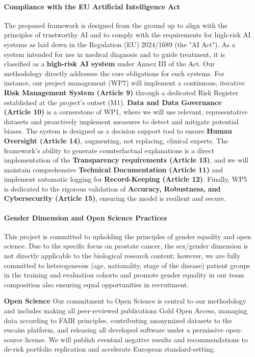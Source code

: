 \documentclass[11pt, a4paper]{article}
\begin{document}
\paragraph{Compliance with the EU Artificial Intelligence Act}
The proposed framework is designed from the ground up to align with the principles of trustworthy AI and to comply with the requirements for high-risk AI systems as laid down in the Regulation (EU) 2024/1689 (the "AI Act"). As a system intended for use in medical diagnosis and to guide treatment, it is classified as a \textbf{high-risk AI system} under Annex III of the Act. Our methodology directly addresses the core obligations for such systems. For instance, our project management (WP7) will implement a continuous, iterative \textbf{Risk Management System (Article 9)} through a dedicated Risk Register established at the project's outset (M1). \textbf{Data and Data Governance (Article 10)} is a cornerstone of WP1, where we will use relevant, representative datasets and proactively implement measures to detect and mitigate potential biases. The system is designed as a decision support tool to ensure \textbf{Human Oversight (Article 14)}, augmenting, not replacing, clinical experts. The framework's ability to generate counterfactual explanations is a direct implementation of the \textbf{Transparency requirements (Article 13)}, and we will maintain comprehensive \textbf{Technical Documentation (Article 11)} and implement automatic logging for \textbf{Record-Keeping (Article 12)}. Finally, WP5 is dedicated to the rigorous validation of \textbf{Accuracy, Robustness, and Cybersecurity (Article 15)}, ensuring the model is resilient and secure.

\paragraph{Gender Dimension and Open Science Practices}
This project is committed to upholding the principles of gender equality and open science. Due to the specific focus on prostate cancer, the sex/gender dimension is not directly applicable to the biological research content; however, we are fully committed to heterogeneous (age, nationality, stage of the disease) patient groups in the training and evaluation cohorts and promote gender equality in our team composition also ensuring equal opportunities in recruitment. 

\textbf{Open Science}
Our commitment to Open Science is central to our methodology and includes making all peer-reviewed publications Gold Open Access, managing data according to FAIR principles, contributing anonymized datasets to the \gls{eucaim} platform, and releasing all developed software under a permissive open-source license. We will publish eventual negative results and recommendations to de-risk portfolio replication and accelerate European standard-setting. 
\end{document}
